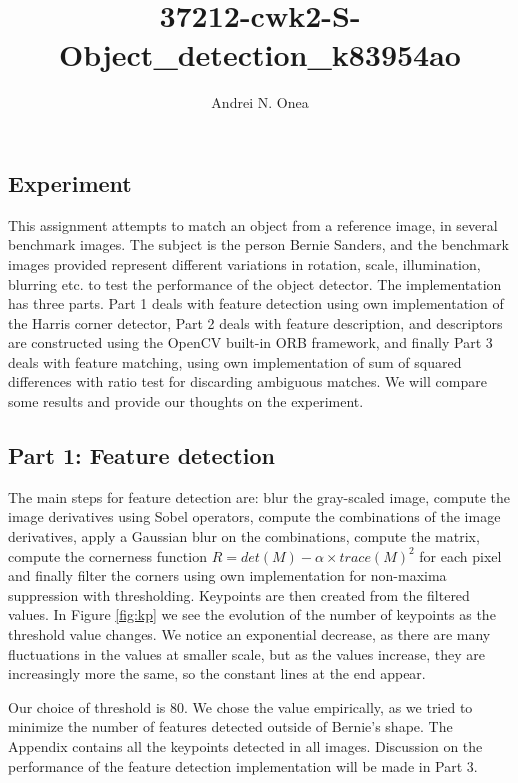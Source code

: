 \documentclass[12pt,a4paper]{report}
\author{Andrei N. Onea}
\title{37212-cwk2-S-Object\_detection\_k83954ao}
\begin{document}
\maketitle

\subsection*{Experiment}

This assignment attempts to match an object from a reference image, in several benchmark images. The subject is the person Bernie Sanders, and the benchmark images provided represent different variations in rotation, scale, illumination, blurring etc. to test the performance of the object detector. The implementation has three parts. Part 1 deals with feature detection using own implementation of the Harris corner detector, Part 2 deals with feature description, and descriptors are constructed using the OpenCV built-in ORB framework, and finally Part 3 deals with feature matching, using own implementation of sum of squared differences with ratio test for discarding ambiguous matches. We will compare some results and provide our thoughts on the experiment.

\subsection*{Part 1: Feature detection}

The main steps for feature detection are: blur the gray-scaled image, compute the image derivatives using Sobel operators, compute the combinations of the image derivatives, apply a Gaussian blur on the combinations, compute the matrix, compute the cornerness function $R=det(M) - \alpha \times trace(M)^{2}$ for each pixel and finally filter the corners using own implementation for non-maxima suppression with thresholding. Keypoints are then created from the filtered values. In Figure \ref{fig:kp} we see the evolution of the number of keypoints as the threshold value changes. We notice an exponential decrease, as there are many fluctuations in the values at smaller scale, but as the values increase, they are increasingly more the same, so the constant lines at the end appear.

Our choice of threshold is 80. We chose the value empirically, as we tried to minimize the number of features detected outside of Bernie's shape. The Appendix contains all the keypoints detected in all images. Discussion on the performance of the feature detection implementation will be made in Part 3.
\end{document}
